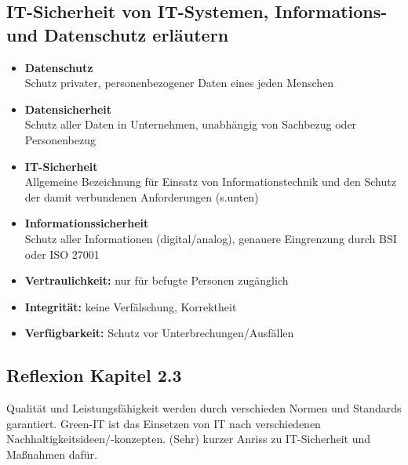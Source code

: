 \subsection{IT-Sicherheit von IT-Systemen, Informations- und Datenschutz erläutern}
    \begin{subindent}
        \begin{itemize}[leftmargin=2.5cm, topsep=0.2em, itemsep=0.1em, parsep=0.3em]
            \item \textbf{Datenschutz} \\
                  Schutz privater, personenbezogener Daten eines jeden Menschen
            \item \textbf{Datensicherheit} \\
                  Schutz aller Daten in Unternehmen, unabhängig von Sachbezug oder Personenbezug
            \item \textbf{IT-Sicherheit} \\
                  Allgemeine Bezeichnung für Einsatz von Informationstechnik und den Schutz der damit verbundenen Anforderungen (s.\@ unten)
            \item \textbf{Informationssicherheit} \\
                  Schutz aller Informationen (digital/analog), genauere Eingrenzung durch BSI oder ISO 27001
        \end{itemize}
    \end{subindent}

    \begin{tcolorbox}[width=14cm, center, title=Gemeinsame Anforderungen für Daten und Systeme, coltitle=white, colframe=orange, colback=white!60!orange]
        \begin{itemize}[itemsep=0.1em, parsep=0.3em]
            \item \textbf{Vertraulichkeit:} nur für befugte Personen zugänglich
            \item \textbf{Integrität:} keine Verfälschung, Korrektheit
            \item \textbf{Verfügbarkeit:} Schutz vor Unterbrechungen/Ausfällen
        \end{itemize}
    \end{tcolorbox}

\subsection*{Reflexion Kapitel 2.3}
    \begin{refindent}
        Qualität und Leistungsfähigkeit werden durch verschieden Normen und Standards garantiert.
        Green-IT ist das Einsetzen von IT nach verschiedenen Nachhaltigkeitsideen/-konzepten.
        (Sehr) kurzer Anriss zu IT-Sicherheit und Maßnahmen dafür.
    \end{refindent}